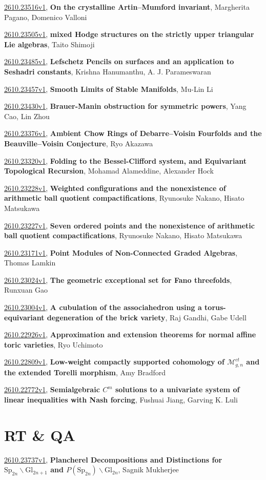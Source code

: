 \documentclass[9pt, a4paper]{article}
\theoremstyle{plain}
\theoremstyle{definition}
\theoremstyle{remark}
\newcommand{\arxiv}[3]{\href{https://arxiv.org/abs/#1}{#1}, \textbf{\textcolor{arxivblue}{#2}}, #3}
\begin{document}
\arxiv{2610.23516v1}{On the crystalline Artin--Mumford invariant}{Margherita Pagano, Domenico Valloni}

\arxiv{2610.23505v1}{mixed Hodge structures on the strictly upper triangular Lie algebras}{Taito Shimoji}

\arxiv{2610.23485v1}{Lefschetz Pencils on surfaces and an application to Seshadri constants}{Krishna Hanumanthu, A. J. Parameswaran}

\arxiv{2610.23457v1}{Smooth Limits of Stable Manifolds}{Mu-Lin Li}

\arxiv{2610.23430v1}{Brauer-Manin obstruction for symmetric powers}{Yang Cao, Lin Zhou}

\arxiv{2610.23376v1}{Ambient Chow Rings of Debarre--Voisin Fourfolds and the Beauville--Voisin Conjecture}{Ryo Akazawa}

\arxiv{2610.23320v1}{Folding to the Bessel-Clifford system, and Equivariant Topological Recursion}{Mohamad Alameddine, Alexander Hock}

\arxiv{2610.23228v1}{Weighted configurations and the nonexistence of arithmetic ball quotient compactifications}{Ryunosuke Nakano, Hisato Matsukawa}

\arxiv{2610.23227v1}{Seven ordered points and the nonexistence of arithmetic ball quotient compactifications}{Ryunosuke Nakano, Hisato Matsukawa}

\arxiv{2610.23171v1}{Point Modules of Non-Connected Graded Algebras}{Thomas Lamkin}

\arxiv{2610.23024v1}{The geometric exceptional set for Fano threefolds}{Runxuan Gao}

\arxiv{2610.23004v1}{A cubulation of the associahedron using a torus-equivariant degeneration of the brick variety}{Raj Gandhi, Gabe Udell}

\arxiv{2610.22926v1}{Approximation and extension theorems for normal affine toric varieties}{Ryo Uchimoto}

\arxiv{2610.22809v1}{Low-weight compactly supported cohomology of $\mathcal M_{g,n}^{ct}$ and the extended Torelli morphism}{Amy Bradford}

\arxiv{2610.22772v1}{Semialgebraic ${C^m}$ solutions to a univariate system of linear inequalities with Nash forcing}{Fushuai Jiang, Garving K. Luli}


\section{RT \& QA}
\arxiv{2610.23737v1}{Plancherel Decompositions and Distinctions for $\mathrm{Sp}_{2n}\backslash \mathrm{Gl}_{2n+1}$ and $P(\mathrm{Sp}_{2n})\backslash \mathrm{Gl}_{2n}$}{Sagnik Mukherjee}
\end{document}
